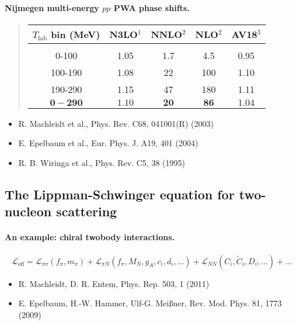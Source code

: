 \documentclass[%
twoside,                 %
final,                   %
10pt]{article}
\begin{document}
\paragraph{Nijmegen multi-energy $pp$ PWA phase shifts.}


\begin{quote}
\begin{tabular}{ccccc}
\hline
\multicolumn{1}{c}{ $T_{\mathrm{lab}}$ bin (MeV) } & \multicolumn{1}{c}{ N3LO$^1$ } & \multicolumn{1}{c}{ NNLO$^2$ } & \multicolumn{1}{c}{ NLO$^2$ } & \multicolumn{1}{c}{ AV18$^3$ } \\
\hline
                             &                 &               &               &                 \\
0-100                        & 1.05            & 1.7           & 4.5           & 0.95            \\
100-190                      & 1.08            & 22            & 100           & 1.10            \\
190-290                      & 1.15            & 47            & 180           & 1.11            \\
$\mathbf{0-290}$             & $\mathbf{1.10}$ & $\mathbf{20}$ & $\mathbf{86}$ & $\mathbf{1.04}$ \\
\hline
\end{tabular}
\end{quote}

\noindent
\begin{itemize}
\item R. Machleidt et al., Phys. Rev. C68, 041001(R) (2003)

\item E. Epelbaum et al., Eur. Phys. J. A19, 401 (2004)

\item R. B. Wiringa et al., Phys. Rev. C5, 38 (1995)
\end{itemize}

\noindent




\subsection*{The Lippman-Schwinger equation for two-nucleon scattering}

\paragraph{An example: chiral twobody interactions.}
\[
\mathcal{L_{\mathrm{eff}}} = \mathcal{L}_{\pi \pi}(f_\pi,m_{\pi}) + \mathcal{L}_{\pi N}(f_{\pi},M_{N},g_A,c_i,d_i,...) + \mathcal{L}_{NN}(C_{i},\tilde{C}_{i},D_{i},...) + \ldots
\]
\begin{itemize}
\item R. Machleidt, D. R. Entem, Phys. Rep. 503, 1 (2011)

\item E. Epelbaum, H.-W. Hammer, Ulf-G. Mei\ss{}ner, Rev. Mod. Phys. 81, 1773 (2009)
\end{itemize}
\end{document}
